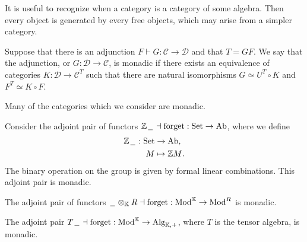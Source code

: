 \documentclass[../thesis.tex]{subfiles}
\begin{document}
        It is useful to recognize when a category is a category of some algebra. Then every object is generated by every free objects, which may arise from a simpler category.
        \begin{definition}[Monadicity]
            Suppose that there is an adjunction $F \vdash G : \mathcal{C} \rightarrow \mathcal{D}$ and that $T = GF$. We say that the adjunction, or $G : \mathcal{D} \rightarrow \mathcal{C}$, is monadic if there exists an equivalence of categories $K : \mathcal{D} \rightarrow \mathcal{C}^T$ such that there are natural isomorphisms $G \simeq U^T\circ K$ and $F^T \simeq K \circ F$.
            \begin{center}
            \end{center}
        \end{definition}

        Many of the categories which we consider are monadic.
        \begin{example}
            Consider the adjoint pair of functors $\mathbb{Z}\hspace{0.05cm}\underline{\hspace{0.2cm}}\hspace{0.05cm} \dashv \text{forget}: \text{Set} \rightarrow \text{Ab}$, where we define
            \begin{align*}
                \mathbb{Z}\hspace{0.05cm}\underline{\hspace{0.2cm}}\hspace{0.05cm} : \text{Set} & \rightarrow \text{Ab}\text{,} \\
                M & \mapsto \mathbb{Z}M\text{.}
            \end{align*} 
            The binary operation on the group is given by formal linear combinations. This adjoint pair is monadic.
        \end{example}

        \begin{example}
            The adjoint pair of functors $\hspace{0.05cm}\underline{\hspace{0.2cm}}\hspace{0.05cm}\otimes_\mathbb{K}R \dashv \text{forget} : \text{Mod}^\mathbb{K} \rightarrow \text{Mod}^R$ is monadic.
        \end{example}

        \begin{example}
            The adjoint pair $T\hspace{0.05cm}\underline{\hspace{0.2cm}}\hspace{0.05cm} \dashv \text{forget} : \text{Mod}^\mathbb{K} \rightarrow \text{Alg}_{\mathbb{K},+}$, where $T$ is the tensor algebra, is monadic.
        \end{example}
\end{document}
